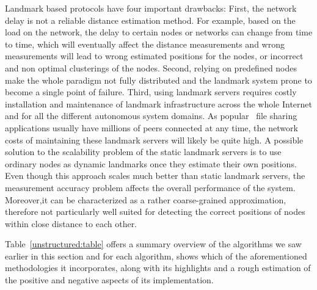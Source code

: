 Landmark based protocols have four important drawbacks: First, the network
delay is not a reliable distance estimation method. For example, based on the
load on the network, the delay to certain nodes or networks can change from time
to time, which will eventually affect the distance measurements and wrong
measurements will lead to wrong estimated positions for the nodes, or incorrect
and non optimal clusterings of the nodes. Second, relying on predefined nodes
make the whole paradigm not fully distributed and the landmark system prone to
become a single point of failure. Third, using
landmark servers requires costly installation and maintenance of landmark
infrastructure across the whole Internet and for all the different autonomous
system domains. 
As popular \p\ file sharing applications usually have millions
of peers connected at any time, the network costs
of maintaining these landmark servers will likely be quite high. 
A possible solution to
the scalability problem of the static landmark servers is to use ordinary nodes
as dynamic landmarks once they estimate their own positions. Even though this
approach scales much better than static landmark servers, the measurement
accuracy problem affects the overall performance of the system. Moreover,it can
be characterized as a rather coarse-grained approximation, therefore not
particularly well suited for detecting the correct positions of nodes within
close distance to each other.

Table~\ref{unstructured:table} offers a summary overview of the algorithms
we saw earlier in this section and for each algorithm, shows which of the
aforementioned methodologies it incorporates, along with its 
highlights and a rough estimation of the
positive and negative aspects of its implementation.




